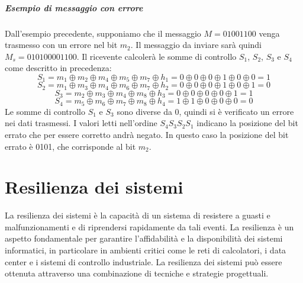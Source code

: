 \documentclass[12pt]{report}
\begin{document}
	\paragraph{Esempio di messaggio con errore}
	Dall'esempio precedente, supponiamo che il messaggio $M = 0100 1100$ venga trasmesso con un errore nel bit $m_2$. Il messaggio da inviare sarà quindi $M_s = 0101 0000 1100$. Il ricevente calcolerà le somme di controllo $S_1$, $S_2$, $S_3$ e $S_4$ come descritto in precedenza:
	\begin{equation*}
		S_1 = m_1 \oplus m_2 \oplus m_4 \oplus m_5 \oplus m_7 \oplus h_1 = 0 \oplus 0 \oplus 0 \oplus 1 \oplus 0 \oplus 0 = 1
	\end{equation*}
	\begin{equation*}
		S_2 = m_1 \oplus m_3 \oplus m_4 \oplus m_6 \oplus m_7 \oplus h_2 = 0 \oplus 0 \oplus 0 \oplus 1 \oplus 0 \oplus 1 = 0
	\end{equation*}
	\begin{equation*}
		S_3 = m_2 \oplus m_3 \oplus m_4 \oplus m_8 \oplus h_3 = 0 \oplus 0 \oplus 0 \oplus 0 \oplus 1 = 1
	\end{equation*}
	\begin{equation*}
		S_4 = m_5 \oplus m_6 \oplus m_7 \oplus m_8 \oplus h_4 = 1 \oplus 1 \oplus 0 \oplus 0 \oplus 0 = 0
	\end{equation*}
	Le somme di controllo $S_1$ e $S_3$ sono diverse da 0, quindi si è verificato un errore nei dati trasmessi. I valori letti nell'ordine $S_4S_3S_2S_1$ indicano la posizione del bit errato che per essere corretto andrà negato. In questo caso la posizione del bit errato è 0101, che corrisponde al bit $m_2$.

	\chapter{Resilienza dei sistemi}
	La resilienza dei sistemi è la capacità di un sistema di resistere a guasti e malfunzionamenti e di riprendersi rapidamente da tali eventi. La resilienza è un aspetto fondamentale per garantire l'affidabilità e la disponibilità dei sistemi informatici, in particolare in ambienti critici come le reti di calcolatori, i data center e i sistemi di controllo industriale. La resilienza dei sistemi può essere ottenuta attraverso una combinazione di tecniche e strategie progettuali.
\end{document}
